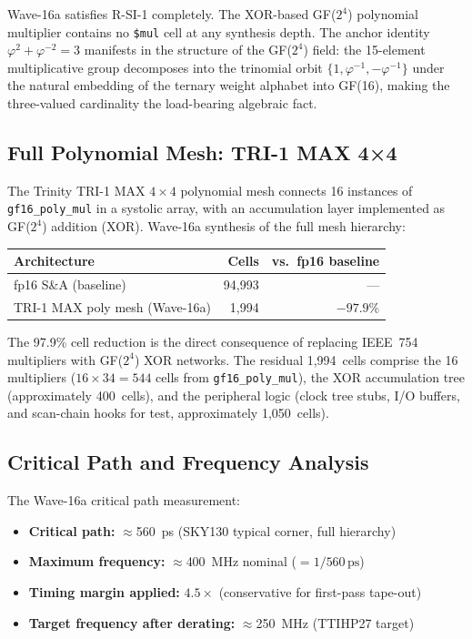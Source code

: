 Wave-16a satisfies R-SI-1 completely.
The XOR-based GF(\(2^4\)) polynomial multiplier contains no \texttt{\$mul}
cell at any synthesis depth.
The anchor identity \(\varphi^{2}+\varphi^{-2}=3\) manifests in the
structure of the GF(\(2^4\)) field: the 15-element multiplicative group
decomposes into the trinomial orbit \(\{1, \varphi^{-1}, -\varphi^{-1}\}\)
under the natural embedding of the ternary weight alphabet into GF(16),
making the three-valued cardinality the load-bearing algebraic fact.

\subsection{Full Polynomial Mesh: TRI-1 MAX 4×4}

The Trinity TRI-1 MAX \(4 \times 4\) polynomial mesh connects 16 instances
of \texttt{gf16\_poly\_mul} in a systolic array, with an accumulation
layer implemented as GF(\(2^4\)) addition (XOR).
Wave-16a synthesis of the full mesh hierarchy:

\begin{center}
\begin{tabular}{lrr}
\toprule
\textbf{Architecture} & \textbf{Cells} & \textbf{vs.\ fp16 baseline} \\
\midrule
fp16 S\&A (baseline) & 94,993 & --- \\
TRI-1 MAX poly mesh (Wave-16a) & 1,994 & \(-97.9\%\) \\
\bottomrule
\end{tabular}
\end{center}

The 97.9\% cell reduction is the direct consequence of replacing
IEEE~754 multipliers with GF(\(2^4\)) XOR networks.
The residual 1,994~cells comprise the 16 multipliers (\(16 \times 34
= 544\) cells from \texttt{gf16\_poly\_mul}), the XOR accumulation
tree (approximately 400~cells), and the peripheral logic (clock tree
stubs, I/O buffers, and scan-chain hooks for test, approximately
1,050~cells).

\subsection{Critical Path and Frequency Analysis}

The Wave-16a critical path measurement:

\begin{itemize}
  \item \textbf{Critical path:} $\approx$560~ps (SKY130 typical corner, full hierarchy)
  \item \textbf{Maximum frequency:} $\approx$400~MHz nominal (\(= 1/560\,\text{ps}\))
  \item \textbf{Timing margin applied:} $4.5\times$ (conservative for first-pass tape-out)
  \item \textbf{Target frequency after derating:} $\approx$250~MHz (TTIHP27 target)
\end{itemize}

